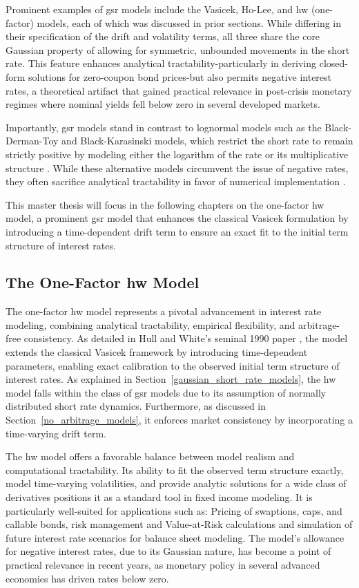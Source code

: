 Prominent examples of \ac{gsr} models include the Vasicek, Ho-Lee, and \ac{hw} (one-factor) models, each of which was discussed in prior sections. While differing in their specification of the drift and volatility terms, all three share the core Gaussian property of allowing for symmetric, unbounded movements in the short rate. This feature enhances analytical tractability-particularly in deriving closed-form solutions for zero-coupon bond prices-but also permits negative interest rates, a theoretical artifact that gained practical relevance in post-crisis monetary regimes where nominal yields fell below zero in several developed markets.

Importantly, \ac{gsr} models stand in contrast to lognormal models such as the Black-Derman-Toy and Black-Karasinski models, which restrict the short rate to remain strictly positive by modeling either the logarithm of the rate or its multiplicative structure . While these alternative models circumvent the issue of negative rates, they often sacrifice analytical tractability in favor of numerical implementation \parencite[p.~718]{hull2015optionsfutures}.

This master thesis will focus in the following chapters on the one-factor \ac{hw} model, a prominent \ac{gsr} model that enhances the classical Vasicek formulation by introducing a time-dependent drift term to ensure an exact fit to the initial term structure of interest rates.

\subsection{The One-Factor \ac{hw} Model}
The one-factor \ac{hw} model represents a pivotal advancement in interest rate modeling, combining analytical tractability, empirical flexibility, and arbitrage-free consistency. As detailed in Hull and White's seminal 1990 paper \parencite{hull1990pricing}, the model extends the classical Vasicek framework by introducing time-dependent parameters, enabling exact calibration to the observed initial term structure of interest rates. As explained in Section~\ref{gaussian_short_rate_models}, the \ac{hw} model falls within the class of \ac{gsr} models due to its assumption of normally distributed short rate dynamics. Furthermore, as discussed in Section~\ref{no_arbitrage_models}, it enforces market consistency by incorporating a time-varying drift term.

The \ac{hw} model offers a favorable balance between model realism and computational tractability. Its ability to fit the observed term structure exactly, model time-varying volatilities, and provide analytic solutions for a wide class of derivatives positions it as a standard tool in fixed income modeling. It is particularly well-suited for applications such as: Pricing of swaptions, caps, and callable bonds, risk management and Value-at-Risk calculations and simulation of future interest rate scenarios for balance sheet modeling. The model's allowance for negative interest rates, due to its Gaussian nature, has become a point of practical relevance in recent years, as monetary policy in several advanced economies has driven rates below zero.

